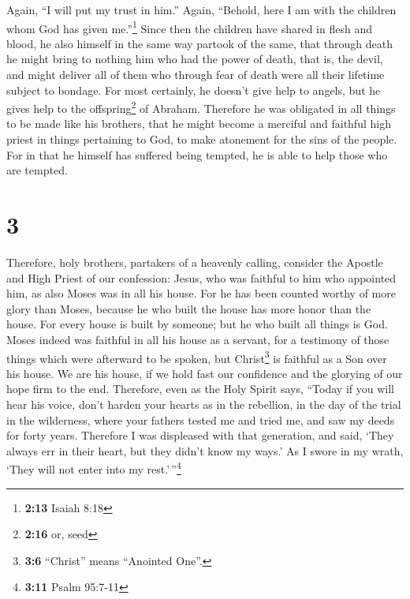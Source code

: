  Again, ``I will put my trust in him.'' Again, ``Behold,
here I am with the children whom God has given me.''\footnote{\textbf{2:13}
  Isaiah 8:18}  Since then the children have shared in
flesh and blood, he also himself in the same way partook of the same,
that through death he might bring to nothing him who had the power of
death, that is, the devil,  and might deliver all of them
who through fear of death were all their lifetime subject to bondage.
 For most certainly, he doesn't give help to angels, but
he gives help to the offspring\footnote{\textbf{2:16} or, seed} of
Abraham.  Therefore he was obligated in all things to be
made like his brothers, that he might become a merciful and faithful
high priest in things pertaining to God, to make atonement for the sins
of the people.  For in that he himself has suffered being
tempted, he is able to help those who are tempted.

\hypertarget{section-2}{%
\section{3}\label{section-2}}

 Therefore, holy brothers, partakers of a heavenly
calling, consider the Apostle and High Priest of our confession: Jesus,
 who was faithful to him who appointed him, as also Moses
was in all his house.  For he has been counted worthy of
more glory than Moses, because he who built the house has more honor
than the house.  For every house is built by someone; but
he who built all things is God.  Moses indeed was faithful
in all his house as a servant, for a testimony of those things which
were afterward to be spoken,  but Christ\footnote{\textbf{3:6}
  ``Christ'' means ``Anointed One''.} is faithful as a Son over his
house. We are his house, if we hold fast our confidence and the glorying
of our hope firm to the end.  Therefore, even as the Holy
Spirit says, ``Today if you will hear his voice,  don't
harden your hearts as in the rebellion, in the day of the trial in the
wilderness,  where your fathers tested me and tried me,
and saw my deeds for forty years.  Therefore I was
displeased with that generation, and said, `They always err in their
heart, but they didn't know my ways.'  As I swore in my
wrath, `They will not enter into my rest.'\,''\footnote{\textbf{3:11}
  Psalm 95:7-11}

